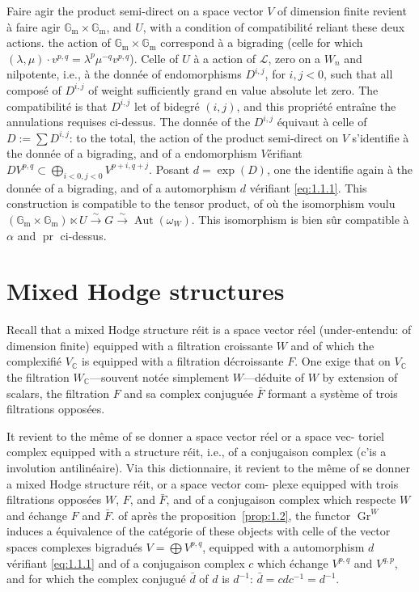 \documentclass[12pt,a4paper]{article}
\theoremstyle{plain}
\theoremstyle{definition}
\DeclareMathOperator{\Gr}{Gr}
\DeclareMathOperator{\Aut}{Aut}
\DeclareMathOperator{\pr}{pr}
\newcommand{\Gm}{\mathbb{G}_\mathrm{m}}
\newcommand{\C}{\mathbb{C}}
\begin{document}
Faire agir the product semi-direct on a space vector $V$ of dimension
finite revient \`{a} faire agir $\Gm \times \Gm$, and $U$, with a condition of compatibilit\'{e}
reliant these deux actions. the action of $\Gm \times \Gm$ correspond \`{a} a bigrading
(celle for which $(\lambda, \mu) \cdot v^{p,q} = \lambda^p \mu^{-q} v^{p,q}$). Celle of $U$ \`{a} a action
of $\mathcal{L}$, zero on a $W_n$ and nilpotente, i.e., \`{a} the donn\'{e}e of endomorphisms
$D^{i,j}$, for $i, j < 0$, such that all compos\'{e} of $D^{i,j}$ of weight sufficiently grand en
value absolute let zero. The compatibilit\'{e} is that $D^{i,j}$ let of bidegr\'{e} $(i, j)$,
and this propri\'{e}t\'{e} entra\^{i}ne the annulations requises ci-dessus. The donn\'{e}e of the
$D^{i,j}$ \'{e}quivaut \`{a} celle of $D := \sum D^{i,j}$: to the total, the action of the product semi-direct
on $V$ s'identifie \`{a} the donn\'{e}e of a bigrading, and of a endomorphism
$V$\'{e}rifiant $D V^{p,q} \subset \bigoplus_{i<0, j<0} V^{p+i,q+j}$. Posant $d = \exp(D)$, one the identifie again
\`{a} the donn\'{e}e of a bigrading, and of a automorphism $d$ v\'{e}rifiant \eqref{eq:1.1.1}.
This construction is compatible to the tensor product, of o\`{u} the isomorphism
voulu $(\Gm \times \Gm) \ltimes U \xrightarrow{\sim} G \xrightarrow{\sim} \Aut(\omega_W)$. This isomorphism is bien s\^{u}r
compatible \`{a} $\alpha$ and $\pr$ ci-dessus.

\section{Mixed Hodge structures}

Recall that a mixed Hodge structure r\'{e}it is a space vector
r\'{e}el (under-entendu: of dimension finite) equipped with a filtration croissante $W$
and of which the complexifi\'{e} $V_\C$ is equipped with a filtration d\'{e}croissante $F$. One
exige that on $V_\C$ the filtration $W_\C$---souvent not\'{e}e simplement $W$---d\'{e}duite
of $W$ by extension of scalars, the filtration $F$ and sa complex conjugu\'{e}e
$\bar{F}$ formant a syst\`{e}me of trois filtrations oppos\'{e}es.

It revient to the m\^{e}me of se donner a space vector r\'{e}el or a space vec-
toriel complex equipped with a structure r\'{e}it, i.e., of a conjugaison complex
(c'is a involution antilin\'{e}aire). Via this dictionnaire, it revient to the m\^{e}me of
se donner a mixed Hodge structure r\'{e}it, or a space vector com-
plexe equipped with trois filtrations oppos\'{e}es $W$, $F$, and $\bar{F}$, and of a conjugaison
complex which respecte $W$ and \'{e}change $F$ and $\bar{F}$. of apr\`{e}s the proposition~\ref{prop:1.2},
the functor $\Gr^W$ induces a \'{e}quivalence of the cat\'{e}gorie of these objects with
celle of the vector spaces complexes bigradu\'{e}s $V = \bigoplus V^{p,q}$, equipped with a
automorphism $d$ v\'{e}rifiant \eqref{eq:1.1.1} and of a conjugaison complex $c$ which
\'{e}change $V^{p,q}$ and $V^{q,p}$, and for which the complex conjugu\'{e} $\bar{d}$ of $d$ is
$d^{-1}$: $\bar{d} = c d c^{-1} = d^{-1}$.
\end{document}
